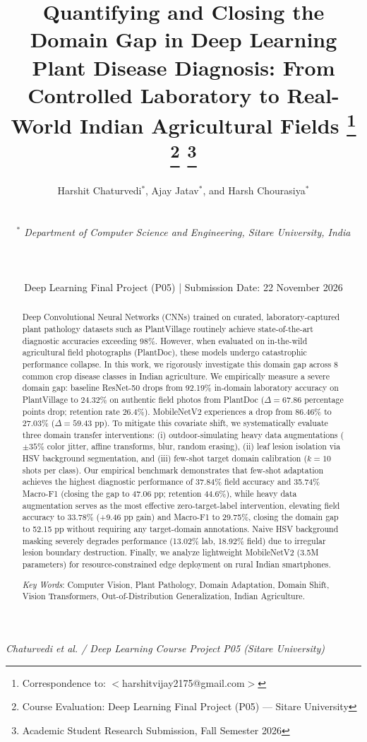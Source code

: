 \documentclass[twoside,a4paper,11pt]{article}
\title{Quantifying and Closing the Domain Gap in Deep Learning Plant Disease Diagnosis: From Controlled Laboratory to Real-World Indian Agricultural Fields
\footnote[0]{Correspondence to: $<$harshitvijay2175@gmail.com$>$}
\footnote[0]{Course Evaluation: Deep Learning Final Project (P05) --- Sitare University}
\footnote[0]{Academic Student Research Submission, Fall Semester 2026}
}
\author{Harshit Chaturvedi$^*$, Ajay Jatav$^*$, and Harsh Chourasiya$^*$ \\ \\
\centerline{\small \em $^*$ Department of Computer Science and Engineering, Sitare University, India} \\ \\
\centerline{\small Deep Learning Final Project (P05) \quad | \quad Submission Date: 22 November 2026}
}
\begin{document}
\maketitle

\pagestyle{myheadings}

         {\centerline{\small \it Chaturvedi et al. / Deep Learning Course Project P05 (Sitare University)}}

\hrulefill

\begin{abstract}
Deep Convolutional Neural Networks (CNNs) trained on curated, laboratory-captured plant pathology datasets such as PlantVillage routinely achieve state-of-the-art diagnostic accuracies exceeding 98\%. However, when evaluated on in-the-wild agricultural field photographs (PlantDoc), these models undergo catastrophic performance collapse. In this work, we rigorously investigate this domain gap across 8 common crop disease classes in Indian agriculture. We empirically measure a severe domain gap: baseline ResNet-50 drops from 92.19\% in-domain laboratory accuracy on PlantVillage to 24.32\% on authentic field photos from PlantDoc ($\Delta = 67.86$ percentage points drop; retention rate 26.4\%). MobileNetV2 experiences a drop from 86.46\% to 27.03\% ($\Delta = 59.43$ pp). To mitigate this covariate shift, we systematically evaluate three domain transfer interventions: (i) outdoor-simulating heavy data augmentations ($\pm 35\%$ color jitter, affine transforms, blur, random erasing), (ii) leaf lesion isolation via HSV background segmentation, and (iii) few-shot target domain calibration ($k=10$ shots per class). Our empirical benchmark demonstrates that few-shot adaptation achieves the highest diagnostic performance of 37.84\% field accuracy and 35.74\% Macro-F1 (closing the gap to 47.06 pp; retention 44.6\%), while heavy data augmentation serves as the most effective zero-target-label intervention, elevating field accuracy to 33.78\% (+9.46 pp gain) and Macro-F1 to 29.75\%, closing the domain gap to 52.15 pp without requiring any target-domain annotations. Naive HSV background masking severely degrades performance (13.02\% lab, 18.92\% field) due to irregular lesion boundary destruction. Finally, we analyze lightweight MobileNetV2 (3.5M parameters) for resource-constrained edge deployment on rural Indian smartphones.

\vspace{0.5cm}
\noindent
{\em Key Words}: Computer Vision, Plant Pathology, Domain Adaptation, Domain Shift, Vision Transformers, Out-of-Distribution Generalization, Indian Agriculture.
\end{abstract}
\end{document}
